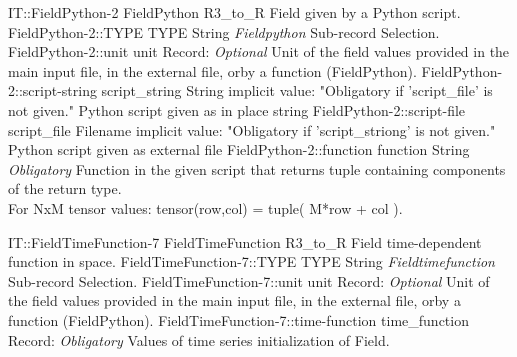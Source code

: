 \begin{RecordType}
	{IT::FieldPython-2}
	{FieldPython}
	{} %
	{} %
	{{{R3{\_}to{\_}R Field given by a Python script.}}}
		\RecKey
			{FieldPython-2::TYPE}
			{TYPE}
			{{String}}
			{ \it{Fieldpython} }
			{{{Sub-record Selection.}}}
		\RecKey
			{FieldPython-2::unit}
			{unit}
			{{Record}{: }}
			{ \it{Optional} }
			{{{Unit of the field values provided in the main input file, in the external file, orby a function (FieldPython).}}}
		\RecKey
			{FieldPython-2::script-string}
			{script{\_}string}
			{{String}}
			{implicit value: "{Obligatory if 'script{\_}file' is not given.}"}
			{{{Python script given as in place string}}}
		\RecKey
			{FieldPython-2::script-file}
			{script{\_}file}
			{{Filename}}
			{implicit value: "{Obligatory if 'script{\_}striong' is not given.}"}
			{{{Python script given as external file}}}
		\RecKey
			{FieldPython-2::function}
			{function}
			{{String}}
			{ \it{Obligatory} }
			{{{Function in the given script that returns tuple containing components of the return type.}\\{
For NxM tensor values: tensor(row,col) = tuple( M*row + col ).}}}
\end{RecordType}
\begin{RecordType}
	{IT::FieldTimeFunction-7}
	{FieldTimeFunction}
	{} %
	{} %
	{{{R3{\_}to{\_}R Field time-dependent function in space.}}}
		\RecKey
			{FieldTimeFunction-7::TYPE}
			{TYPE}
			{{String}}
			{ \it{Fieldtimefunction} }
			{{{Sub-record Selection.}}}
		\RecKey
			{FieldTimeFunction-7::unit}
			{unit}
			{{Record}{: }}
			{ \it{Optional} }
			{{{Unit of the field values provided in the main input file, in the external file, orby a function (FieldPython).}}}
		\RecKey
			{FieldTimeFunction-7::time-function}
			{time{\_}function}
			{{Record}{: }}
			{ \it{Obligatory} }
			{{{Values of time series initialization of Field.}}}
\end{RecordType}
